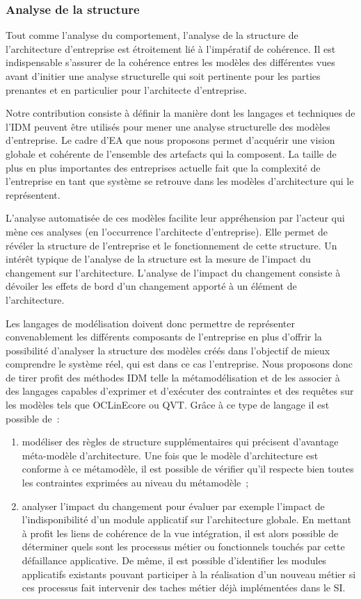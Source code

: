 \subsubsection{Analyse de la structure}
Tout comme l'analyse du comportement, l'analyse de la structure de l'architecture d'entreprise est étroitement lié à l'impératif de cohérence.  Il est indispensable s'assurer de la cohérence entres les modèles des différentes vues avant d'initier une analyse structurelle qui soit pertinente pour les parties prenantes et en particulier pour l'architecte d'entreprise. 

Notre contribution consiste à définir la manière dont les langages et techniques de l'IDM peuvent être utilisés pour mener une analyse structurelle des modèles d'entreprise. Le cadre d'EA que nous proposons permet d'acquérir une vision globale et cohérente de l'ensemble des artefacts qui la composent. La taille de plus en plus importantes des entreprises actuelle fait que la complexité de l'entreprise en tant que système se retrouve dans les modèles d'architecture qui le représentent.

L'analyse automatisée de ces modèles facilite leur appréhension par l'acteur qui mène ces analyses (en l'occurrence l'architecte d'entreprise). Elle permet de révéler la structure de l'entreprise et le fonctionnement de cette structure. Un intérêt  typique de l'analyse de la structure est la mesure de l'impact du changement \cite{de2005change} sur l'architecture. L'analyse de l'impact du changement consiste à dévoiler les effets de bord d'un changement apporté à un élément de l'architecture.  

Les langages de modélisation doivent donc permettre de représenter convenablement les différents composants de l'entreprise en plus d'offrir la possibilité d'analyser la structure des modèles créés dans l'objectif de mieux comprendre le système réel, qui est dans ce cas l'entreprise. Nous proposons donc de tirer profit des méthodes IDM telle la métamodélisation et de les associer à des langages capables d'exprimer et d'exécuter des contraintes et des requêtes sur les modèles tels que OCLinEcore ou QVT. Grâce à ce type de langage il est possible de~:
\begin{enumerate}
\item modéliser des règles de structure supplémentaires qui précisent d'avantage méta-modèle d'architecture. Une fois que le modèle d'architecture est conforme à ce métamodèle, il est possible de vérifier qu'il respecte bien toutes les contraintes exprimées au niveau du métamodèle~;
\item analyser l'impact du changement pour évaluer par exemple l'impact de l'indisponibilité d'un module applicatif sur l'architecture globale. En mettant à profit les liens de cohérence de la vue intégration, il est alors possible de déterminer quels sont les processus métier ou fonctionnels touchés par cette défaillance applicative. De même, il est possible d'identifier les modules applicatifs existants pouvant participer à la réalisation d'un nouveau métier si ces processus fait intervenir des taches métier déjà implémentées dans le SI.
\end{enumerate}




